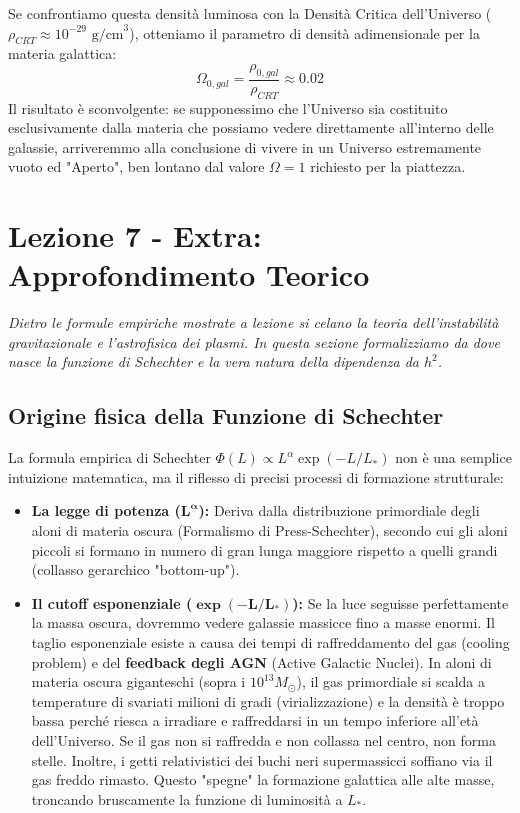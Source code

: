 \documentclass[11pt,a4paper]{report}
\begin{document}
Se confrontiamo questa densità luminosa con la Densità Critica dell'Universo ($\rho_{CRT} \approx 10^{-29} \text{ g/cm}^3$), otteniamo il parametro di densità adimensionale per la materia galattica:
\begin{equation}
\Omega_{0,gal} = \frac{\rho_{0,gal}}{\rho_{CRT}} \approx 0.02
\end{equation}
Il risultato è sconvolgente: se supponessimo che l'Universo sia costituito esclusivamente dalla materia che possiamo vedere direttamente all'interno delle galassie, arriveremmo alla conclusione di vivere in un Universo estremamente vuoto ed "Aperto", ben lontano dal valore $\Omega = 1$ richiesto per la piattezza. 

\newpage
\section{Lezione 7 - Extra: Approfondimento Teorico}

\textit{Dietro le formule empiriche mostrate a lezione si celano la teoria dell'instabilità gravitazionale e l'astrofisica dei plasmi. In questa sezione formalizziamo da dove nasce la funzione di Schechter e la vera natura della dipendenza da $h^2$.}

\subsection{Origine fisica della Funzione di Schechter}
La formula empirica di Schechter $\Phi(L) \propto L^\alpha \exp(-L/L_*)$ non è una semplice intuizione matematica, ma il riflesso di precisi processi di formazione strutturale:
\begin{itemize}
    \item \textbf{La legge di potenza ($\mathbf{L^\alpha}$):} Deriva dalla distribuzione primordiale degli aloni di materia oscura (Formalismo di Press-Schechter), secondo cui gli aloni piccoli si formano in numero di gran lunga maggiore rispetto a quelli grandi (collasso gerarchico "bottom-up").
    \item \textbf{Il cutoff esponenziale ($\mathbf{\exp(-L/L_*)}$):} Se la luce seguisse perfettamente la massa oscura, dovremmo vedere galassie massicce fino a masse enormi. Il taglio esponenziale esiste a causa dei tempi di raffreddamento del gas (cooling problem) e del \textbf{feedback degli AGN} (Active Galactic Nuclei). In aloni di materia oscura giganteschi (sopra i $10^{13} M_\odot$), il gas primordiale si scalda a temperature di svariati milioni di gradi (virializzazione) e la densità è troppo bassa perché riesca a irradiare e raffreddarsi in un tempo inferiore all'età dell'Universo. Se il gas non si raffredda e non collassa nel centro, non forma stelle. Inoltre, i getti relativistici dei buchi neri supermassicci soffiano via il gas freddo rimasto. Questo "spegne" la formazione galattica alle alte masse, troncando bruscamente la funzione di luminosità a $L_*$.
\end{itemize}
\end{document}
